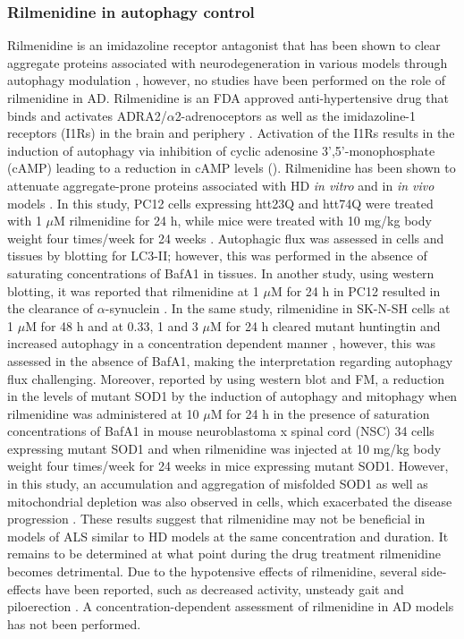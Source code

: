 \subsubsection{Rilmenidine in autophagy control}
Rilmenidine is an imidazoline receptor antagonist that has been shown to clear aggregate proteins associated with neurodegeneration in various models through autophagy modulation \citep{Rose2010,Williams2008,Perera2018}, however, no studies have been performed on the role of rilmenidine in AD. Rilmenidine is an FDA approved anti-hypertensive drug that binds and activates ADRA2/$\alpha$2-adrenoceptors as well as the imidazoline-1 receptors (I1Rs) in the brain and periphery \citep{Rose2010}. Activation of the I1Rs results in the induction of autophagy via inhibition of cyclic adenosine 3',5'-monophosphate (cAMP) leading to a reduction in cAMP levels \citep{Williams2008} (). Rilmenidine has been shown to attenuate aggregate-prone proteins associated with HD \textit{in vitro} and in \textit{in vivo} models \citep{Rose2010}. In this study, PC12 cells expressing htt23Q and htt74Q were treated with 1 $\mu$M rilmenidine for 24 h, while mice were treated with 10 mg/kg body weight four times/week for 24 weeks \citep{Rose2010}. Autophagic flux was assessed in cells and tissues by blotting for LC3-II; however, this was performed in the absence of saturating concentrations of BafA1 in tissues. In another study, using western blotting, it was reported that rilmenidine at 1 $\mu$M for 24 h in PC12 resulted in the clearance of $\alpha$-synuclein \citep{Williams2008}. In the same study, rilmenidine in SK-N-SH cells at 1 $\mu$M for 48 h and at 0.33, 1 and 3 $\mu$M for 24 h cleared mutant huntingtin and increased autophagy in a concentration dependent manner \citep{Williams2008}, however, this was assessed in the absence of BafA1, making the interpretation regarding autophagy flux challenging. Moreover,  \citet{Perera2018} reported by using western blot and FM, a reduction in the levels of mutant SOD1 by the induction of autophagy and mitophagy when rilmenidine was administered at 10 $\mu$M for 24 h in the presence of saturation concentrations of BafA1 in mouse neuroblastoma x spinal cord (NSC) 34 cells expressing mutant SOD1 and when rilmenidine was injected at 10 mg/kg body weight four times/week for 24 weeks in mice expressing mutant SOD1. However, in this study, an accumulation and aggregation of misfolded SOD1 as well as mitochondrial depletion was also observed in cells, which exacerbated the disease progression \citep{Perera2018}. These results suggest that rilmenidine may not be beneficial in models of ALS similar to HD models at the same concentration and duration. It remains to be determined at what point during the drug treatment rilmenidine becomes detrimental. Due to the hypotensive effects of rilmenidine, several side-effects have been reported, such as decreased activity, unsteady gait and piloerection \citep{Rose2010}. A concentration-dependent assessment of rilmenidine in AD models has not been performed.
 

